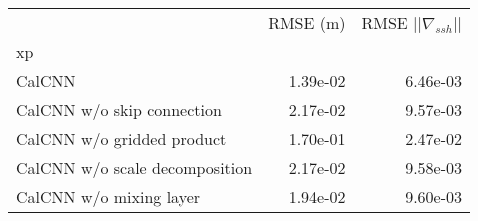 \begin{tabular}{lrr}
\toprule
 & RMSE (m) & RMSE $|| \nabla_{ssh} ||$ \\
xp &  &  \\
\midrule
CalCNN & 1.39e-02 & 6.46e-03 \\
CalCNN w/o skip connection & 2.17e-02 & 9.57e-03 \\
CalCNN w/o gridded product & 1.70e-01 & 2.47e-02 \\
CalCNN w/o scale decomposition & 2.17e-02 & 9.58e-03 \\
CalCNN w/o mixing layer & 1.94e-02 & 9.60e-03 \\
\bottomrule
\end{tabular}
